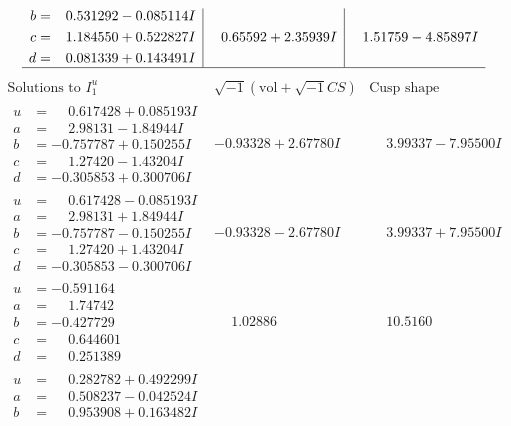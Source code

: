 \documentclass[1p]{elsarticle_modified}
\theoremstyle{definition}
\newcommand{\I}{\sqrt{-1}}
\begin{document}
$$\begin{array}{c|c|c}
\begin{aligned}
b &= \phantom{-}0.531292 - 0.085114 I \\
c &= \phantom{-}1.184550 + 0.522827 I \\
d &= \phantom{-}0.081339 + 0.143491 I\end{aligned}
 & \phantom{-}0.65592 + 2.35939 I & \phantom{-}1.51759 - 4.85897 I\\
 \hline 
 \end{array}$$\newpage$$\begin{array}{c|c|c}  
\text{Solutions to }I^u_{1}& \I (\text{vol} + \sqrt{-1}CS) & \text{Cusp shape}\\
 \hline 
\begin{aligned}
u &= \phantom{-}0.617428 + 0.085193 I \\
a &= \phantom{-}2.98131 - 1.84944 I \\
b &= -0.757787 + 0.150255 I \\
c &= \phantom{-}1.27420 - 1.43204 I \\
d &= -0.305853 + 0.300706 I\end{aligned}
 & -0.93328 + 2.67780 I & \phantom{-}3.99337 - 7.95500 I \\ \hline\begin{aligned}
u &= \phantom{-}0.617428 - 0.085193 I \\
a &= \phantom{-}2.98131 + 1.84944 I \\
b &= -0.757787 - 0.150255 I \\
c &= \phantom{-}1.27420 + 1.43204 I \\
d &= -0.305853 - 0.300706 I\end{aligned}
 & -0.93328 - 2.67780 I & \phantom{-}3.99337 + 7.95500 I \\ \hline\begin{aligned}
u &= -0.591164\phantom{ +0.000000I} \\
a &= \phantom{-}1.74742\phantom{ +0.000000I} \\
b &= -0.427729\phantom{ +0.000000I} \\
c &= \phantom{-}0.644601\phantom{ +0.000000I} \\
d &= \phantom{-}0.251389\phantom{ +0.000000I}\end{aligned}
 & \phantom{-}1.02886\phantom{ +0.000000I} & \phantom{-}10.5160\phantom{ +0.000000I} \\ \hline\begin{aligned}
u &= \phantom{-}0.282782 + 0.492299 I \\
a &= \phantom{-}0.508237 - 0.042524 I \\
b &= \phantom{-}0.953908 + 0.163482 I \\

\end{aligned}
\end{array}$$
\end{document}
